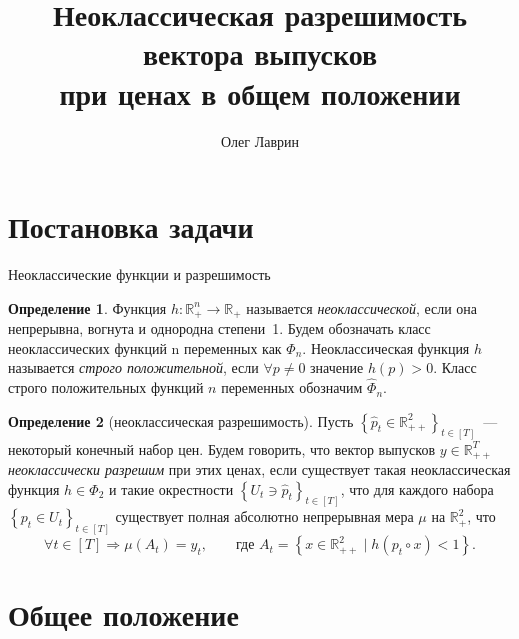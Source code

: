 \documentclass[10pt,aspectratio=169]{beamer}
\title{Неоклассическая разрешимость вектора выпусков\\ при ценах в общем положении}
\author{Олег Лаврин}
\institute{}
\date{}
\theoremstyle{plain}
\theoremstyle{definition}
\newtheorem{defn}{Определение}
\newcommand{\R}{\mathbb{R}}
\newcommand{\set}[1]{\left\{ #1 \right\}}
\newcommand{\Rpp}[1][2]{\R^{#1}_{++}}
\newcommand{\Rp}[1][2]{\R^{#1}_{+}}
\newcommand{\PhiHat}{\hat{\Phi}}
\begin{document}
\begin{frame}
    \titlepage
\end{frame}

\section{Постановка задачи}

\begin{frame}{Неоклассические функции и разрешимость}
    \begin{defn}
        Функция $h:\Rp[n]\to\R_{+}$ называется \emph{неоклассической}, если она непрерывна, вогнута и однородна степени~1. Будем обозначать класс неоклассических функций n переменных как $\Phi_n$.
        Неоклассическая функция $h$ называется \emph{строго положительной}, если 
        $\forall p \ne 0$ значение $h(p)>0$.
        Класс строго положительных функций $n$ переменных обозначим $\PhiHat_n$.
    \end{defn}


    \begin{defn}[неоклассическая разрешимость]
        Пусть $\set{\hat p_t\in\Rpp}_{t\in[T]}$~--- некоторый конечный набор цен. Будем говорить, что вектор выпусков $y\in\Rpp[T]$ \emph{неоклассически разрешим} при этих ценах, если существует такая неоклассическая функция $h\in\Phi_2$ и такие окрестности $\set{U_t\ni\hat p_t}_{t\in[T]}$, что для каждого набора $\set{p_t\in U_t}_{t\in[T]}$ существует полная абсолютно непрерывная мера $\mu$ на $\Rp$, что
        \[
            \forall t\in[T]\Rightarrow\mu(A_t)=y_t,\qquad\text{где } A_t=\set{x\in\Rpp\mid h(p_t\circ x)<1}.
        \]
    \end{defn}
\end{frame}


\section{Общее положение}
\end{document}

